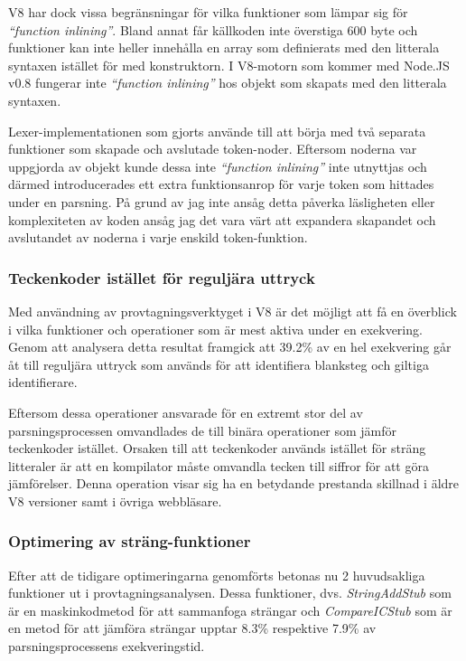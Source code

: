 V8 har dock vissa begränsningar för vilka funktioner som lämpar sig för
\textit{``function inlining''}.  Bland annat får källkoden inte överstiga 600
byte och funktioner kan inte heller innehålla en array som definierats med den
litterala syntaxen istället för med konstruktorn. I V8-motorn som kommer med
Node.JS v0.8 fungerar inte \textit{``function inlining''} hos objekt som
skapats med den litterala syntaxen.


Lexer-implementationen som gjorts använde till att börja med två separata
funktioner som skapade och avslutade token-noder. Eftersom noderna var
uppgjorda av objekt kunde dessa inte \textit{``function inlining''} inte
utnyttjas och därmed introducerades ett extra funktionsanrop för varje token
som hittades under en parsning. På grund av jag inte ansåg detta påverka
läsligheten eller komplexiteten av koden ansåg jag det vara värt att expandera
skapandet och avslutandet av noderna i varje enskild token-funktion.

\subsubsection{Teckenkoder istället för reguljära uttryck}

Med användning av provtagningsverktyget i V8 är det möjligt att få en överblick
i vilka funktioner och operationer som är mest aktiva under en exekvering.
Genom att analysera detta resultat framgick att 39.2\% av en hel exekvering
går åt till reguljära uttryck som används för att identifiera blanksteg och
giltiga identifierare.

Eftersom dessa operationer ansvarade för en extremt stor del av
parsningsprocessen omvandlades de till binära operationer som jämför
teckenkoder istället. Orsaken till att teckenkoder används istället för sträng
litteraler är att en kompilator måste omvandla tecken till siffror för att göra
jämförelser. Denna operation visar sig ha en betydande prestanda skillnad i
äldre V8 versioner samt i övriga webbläsare.


\subsubsection{Optimering av sträng-funktioner}

Efter att de tidigare optimeringarna genomförts betonas nu 2 huvudsakliga
funktioner ut i provtagningsanalysen. Dessa funktioner, dvs.
\textit{StringAddStub} som är en maskinkodmetod för att sammanfoga strängar
och \textit{CompareICStub} som är en metod för att jämföra strängar upptar
8.3\% respektive 7.9\% av parsningsprocessens exekveringstid.

